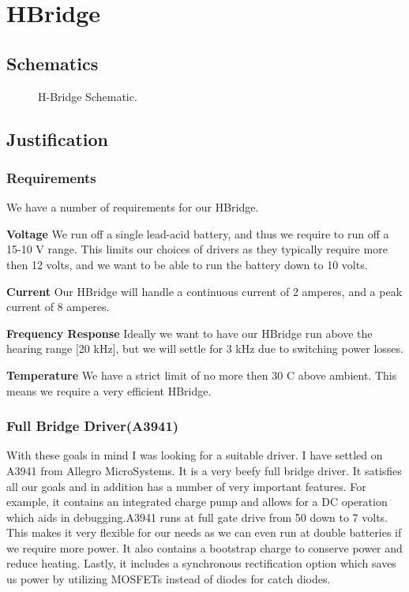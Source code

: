 \documentclass[12pt]{article}
\newcommand{\figuremine}[2]{
\begin{figure}[H]
\noindent\makebox[\textwidth]{
 \texttt{[image: \#1]}}
 \caption{#2}
\end{figure}
}
\begin{document}
\newpage
\section{HBridge}
\subsection{Schematics}
\figuremine{~/ece445/Chalk-Bot/Hardware/H_Bridge/page1.png}{H-Bridge Schematic.}
\subsection{Justification}
\subsubsection{Requirements}
We have a number of requirements for our HBridge.
\begin{description}
\item{\bf Voltage} We run off a single lead-acid battery, and thus we require to run off a 15-10 V range. This limits our choices of drivers as they typically require more then 12 volts, and we want to be able to run the battery down to 10 volts.
\item{\bf Current} Our HBridge will handle a continuous current of 2 amperes, and a peak current of 8 amperes.
\item{\bf Frequency Response} Ideally we want to have our HBridge run above the hearing range [20 kHz], but we will settle for 3 kHz due to switching power losses.
\item{\bf Temperature} We have a strict limit of no more then 30 C above ambient. This means we require a very efficient HBridge.
\end{description}
\subsubsection{Full Bridge Driver(A3941)}
With these goals in mind I was looking for a suitable driver. I have settled on A3941 from Allegro MicroSystems. It is a very beefy full bridge driver. It satisfies all our goals and in addition has a number of very important features. For example, it contains an integrated charge pump and allows for a DC operation which aids in debugging.A3941 runs at full gate drive from 50 down to 7 volts. This makes it very flexible for our needs as we can even run at double batteries if we require more power.  It also contains a bootstrap charge to conserve power and reduce heating. Lastly, it includes a synchronous rectification option which saves us power by utilizing MOSFETs instead of diodes for catch diodes.
\end{document}
